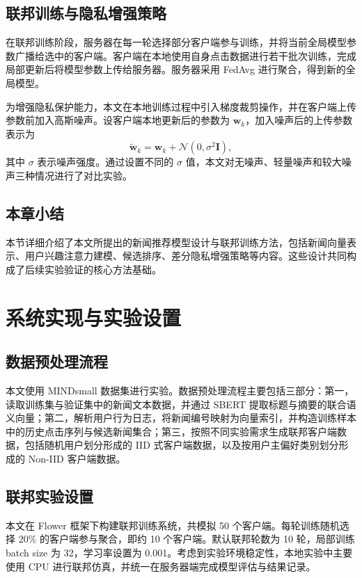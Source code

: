 \documentclass[UTF8,a4paper,12pt]{ctexart}
\numberwithin{equation}{section}
\begin{document}
\subsection{联邦训练与隐私增强策略}
在联邦训练阶段，服务器在每一轮选择部分客户端参与训练，并将当前全局模型参数广播给选中的客户端。客户端在本地使用自身点击数据进行若干批次训练，完成局部更新后将模型参数上传给服务器。服务器采用 FedAvg 进行聚合，得到新的全局模型。

为增强隐私保护能力，本文在本地训练过程中引入梯度裁剪操作，并在客户端上传参数前加入高斯噪声。设客户端本地更新后的参数为 $\mathbf{w}_k$，加入噪声后的上传参数表示为
\begin{equation}
\tilde{\mathbf{w}}_k=\mathbf{w}_k+\mathcal{N}(0,\sigma^2 \mathbf{I}),
\end{equation}
其中 $\sigma$ 表示噪声强度。通过设置不同的 $\sigma$ 值，本文对无噪声、轻量噪声和较大噪声三种情况进行了对比实验。

\subsection{本章小结}
本节详细介绍了本文所提出的新闻推荐模型设计与联邦训练方法，包括新闻向量表示、用户兴趣注意力建模、候选排序、差分隐私增强策略等内容。这些设计共同构成了后续实验验证的核心方法基础。

\newpage
{}
\section{系统实现与实验设置}
\subsection{数据预处理流程}
本文使用 MINDsmall 数据集进行实验。数据预处理流程主要包括三部分：第一，读取训练集与验证集中的新闻文本数据，并通过 SBERT 提取标题与摘要的联合语义向量；第二，解析用户行为日志，将新闻编号映射为向量索引，并构造训练样本中的历史点击序列与候选新闻集合；第三，按照不同实验需求生成联邦客户端数据，包括随机用户划分形成的 IID 式客户端数据，以及按用户主偏好类别划分形成的 Non-IID 客户端数据。

\subsection{联邦实验设置}
本文在 Flower 框架下构建联邦训练系统，共模拟 50 个客户端。每轮训练随机选择 20\% 的客户端参与聚合，即约 10 个客户端。默认联邦轮数为 10 轮，局部训练 batch size 为 32，学习率设置为 0.001。考虑到实验环境稳定性，本地实验中主要使用 CPU 进行联邦仿真，并统一在服务器端完成模型评估与结果记录。
\end{document}
